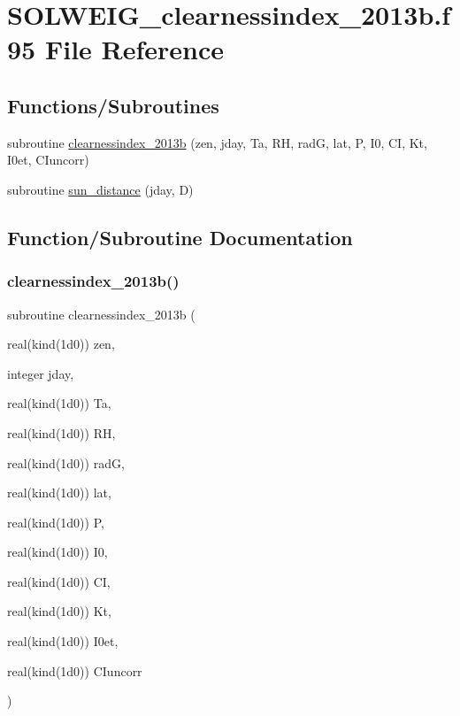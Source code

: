 \hypertarget{_s_o_l_w_e_i_g__clearnessindex__2013b_8f95}{}\section{S\+O\+L\+W\+E\+I\+G\+\_\+clearnessindex\+\_\+2013b.\+f95 File Reference}
\label{_s_o_l_w_e_i_g__clearnessindex__2013b_8f95}
\subsection*{Functions/\+Subroutines}
\begin{DoxyCompactItemize}
\item 
subroutine \hyperlink{_s_o_l_w_e_i_g__clearnessindex__2013b_8f95_a258ef96aee5783c494f7167ead080555}{clearnessindex\+\_\+2013b} (zen, jday, Ta, RH, radG, lat, P, I0, CI, Kt, I0et, C\+Iuncorr)
\item 
subroutine \hyperlink{_s_o_l_w_e_i_g__clearnessindex__2013b_8f95_a75e96c888db31101f20ca8790e5e9c13}{sun\+\_\+distance} (jday, D)
\end{DoxyCompactItemize}


\subsection{Function/\+Subroutine Documentation}
\mbox{\label{_s_o_l_w_e_i_g__clearnessindex__2013b_8f95_a258ef96aee5783c494f7167ead080555}} 
\subsubsection{\texorpdfstring{clearnessindex\+\_\+2013b()}{clearnessindex\_2013b()}}
{\footnotesize\ttfamily subroutine clearnessindex\+\_\+2013b (\begin{DoxyParamCaption}\item[{real(kind(1d0))}]{zen,  }\item[{integer}]{jday,  }\item[{real(kind(1d0))}]{Ta,  }\item[{real(kind(1d0))}]{RH,  }\item[{real(kind(1d0))}]{radG,  }\item[{real(kind(1d0))}]{lat,  }\item[{real(kind(1d0))}]{P,  }\item[{real(kind(1d0))}]{I0,  }\item[{real(kind(1d0))}]{CI,  }\item[{real(kind(1d0))}]{Kt,  }\item[{real(kind(1d0))}]{I0et,  }\item[{real(kind(1d0))}]{C\+Iuncorr }\end{DoxyParamCaption})}



